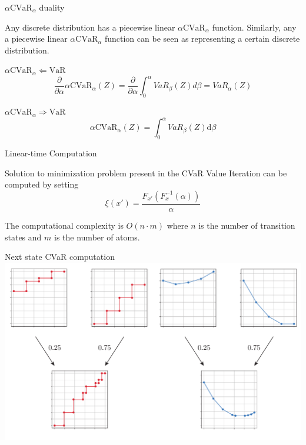 \documentclass{beamer}
\newcommand{\cvar}{\text{CVaR}}
\newcommand{\var}{\text{VaR}}
\newcommand{\dt}{\text{d}}
\begin{document}
\begin{frame}{$\alpha\cvar_\alpha$ duality}
\begin{lemma}
Any discrete distribution has a piecewise linear $\alpha\cvar_\alpha$ function. Similarly, any a piecewise linear $\alpha\cvar_\alpha$ function can be seen as representing a certain discrete distribution.
\end{lemma}

\begin{block}{$\alpha\cvar_\alpha 	\Leftarrow \var$}
$$\dfrac{\partial}{\partial \alpha} \alpha \cvar_\alpha(Z) = \dfrac{\partial}{\partial \alpha} \int_0^\alpha VaR_\beta(Z) d\beta = VaR_\alpha(Z)$$
\end{block}


\begin{block}{$\alpha\cvar_\alpha 	\Rightarrow \var$}
$$\alpha \cvar_\alpha(Z) = \int_0^\alpha VaR_\beta(Z) \dt \beta$$
\end{block}

\end{frame}


\begin{frame}{Linear-time Computation}

\begin{theorem}
Solution to minimization problem present in the CVaR Value Iteration can be computed by setting
$$\xi ( x' ) = \dfrac{F_{x'}(F^{-1}_x(\alpha))}{\alpha} $$

The computational complexity is $O(n\cdot m)$ where $n$ is the number of transition states and $m$ is the number of atoms.
\end{theorem}
\end{frame}

\begin{frame}{Next state CVaR computation}
\center
\includegraphics[width=\linewidth]{../gfx/multivarvar.pdf}
\end{frame}
\end{document}
